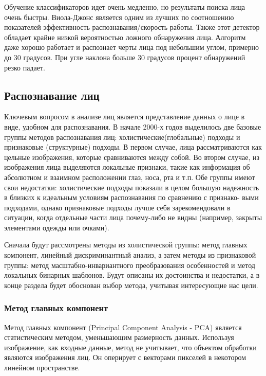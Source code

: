Обучение классификаторов идет очень медленно, но результаты поиска
лица очень быстры. Виола-Джонс является
одним из лучших по соотношению показателей эффективность
распознавания/скорость работы. Также этот детектор
обладает крайне низкой вероятностью ложного обнаружения лица. Алгоритм
даже хорошо работает и распознает черты
лица под небольшим углом, примерно до 30 градусов. При угле
наклона больше 30 градусов
процент обнаружений резко падает.

\subsection{Распознавание лиц}

Ключевым вопросом в анализе лиц
является представление данных о лице в виде, удобном для распознавания.
В начале 2000-х годов выделилось две базовые группы методов распознавания лиц:
холистические(глобальные) подходы и признаковые (структурные)
подходы. В первом случае, лица рассматриваются как цельные изображения,
которые сравниваются между собой. Во втором случае, из изображения лица
выделяются локальные признаки, такие как информация об абсолютном
и взаимном расположении глаз, носа, рта и т.п. Обе группы имеют свои
недостатки: холистические подходы показали в целом большую надежность
в близких к идеальным условиям распознавания по сравнению с признако-
выми подходами, однако признаковые подходы лучше себя зарекомендовали
в ситуации, когда отдельные части лица почему-либо не видны (например,
закрыты элементами одежды или очками).

Сначала будут рассмотрены методы из холистической группы: метод главных компонент,
линейный дискриминантный анализ, а затем методы из признаковой группы:
метод масштабно-инвариантного преобразования особенностей и метод
локальных бинарных шаблонов. Будут описаны их достоинства и недостатки,
а в конце раздела будет обоснован выбор метода, учитывая интересующие нас цели.

\subsubsection{Метод главных компонент}

Метод главных компонент (Principal Component Analysis - PCA)
\cite{PCA} является статистическим методом, уменьшающим размерность
данных. Используя изображение, как входные данные, метод не учитывает, что
объектом обработки являются изображения лиц. Он оперирует с векторами пикселей в
некотором линейном пространстве.


